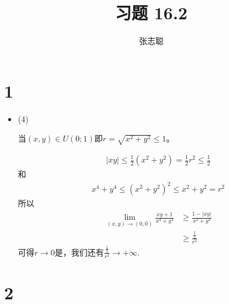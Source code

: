 \documentclass{article}
\begin{document}
\title{习题 16.2}
\author{张志聪}
\maketitle

\section*{1}

\begin{itemize}
  \item (4)

        当$(x, y) \in U(0; 1)$即$r = \sqrt{x^2 + y^2} \leq 1$。

        \begin{align*}
          |xy| \leq \frac{1}{2} (x^2 + y^2) = \frac{1}{2} r^2 \leq \frac{1}{2}
        \end{align*}
        和
        \begin{align*}
          x^4 + y^4 \leq (x^2 + y^2)^2 \leq x^2 + y^2 = r^2
        \end{align*}
        所以
        \begin{align*}
          \lim\limits_{(x, y) \to (0, 0)} \frac{xy + 1}{x^4 + y^4}
           & \geq \frac{1 - |xy|}{x^2 + y^2} \\
           & \geq \frac{\frac{1}{2}}{r^2}
        \end{align*}
        可得$r \to 0$是，我们还有$\frac{\frac{1}{2}}{r^2} \to +\infty$.

\end{itemize}

\section*{2}
\end{document}
